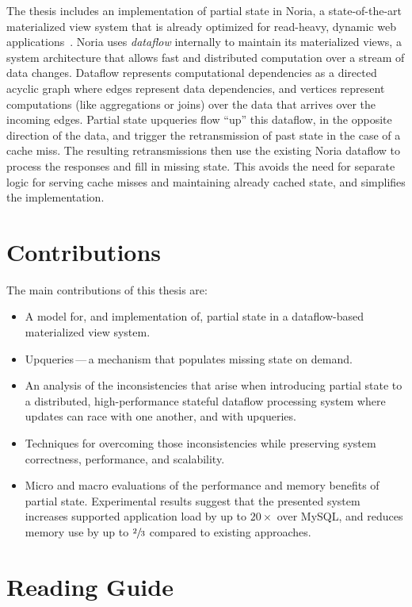 The thesis includes an implementation of partial state in Noria, a
state-of-the-art materialized view system that is already optimized for
read-heavy, dynamic web applications~\cite{noria}. Noria uses \textit{dataflow}
internally to maintain its materialized views, a system architecture that allows
fast and distributed computation over a stream of data changes. Dataflow
represents computational dependencies as a directed acyclic graph where edges
represent data dependencies, and vertices represent computations (like
aggregations or joins) over the data that arrives over the incoming edges.
Partial state upqueries flow ``up'' this dataflow, in the opposite direction of
the data, and trigger the retransmission of past state in the case of a cache
miss. The resulting retransmissions then use the existing Noria dataflow to
process the responses and fill in missing state. This avoids the need for
separate logic for serving cache misses and maintaining already cached state,
and simplifies the implementation.

\section{Contributions}
\label{s:contrib}

The main contributions of this thesis are:

\begin{itemize}
 \item A model for, and implementation of, partial state in a dataflow-based
   materialized view system.
 \item Upqueries\,---\,a mechanism that populates missing state on demand.
 \item An analysis of the inconsistencies that arise when introducing partial
   state to a distributed, high-performance stateful dataflow processing system
    where updates can race with one another, and with upqueries.
 \item Techniques for overcoming those inconsistencies while preserving system
   correctness, performance, and scalability.
 \item Micro and macro evaluations of the performance and memory benefits of
   partial state. Experimental results suggest that the presented system
    increases supported application load by up to $20\times$ over MySQL, and
    reduces memory use by up to $\sfrac{2}{3}$ compared to existing approaches.
\end{itemize}

\section{Reading Guide}
\label{s:read}

